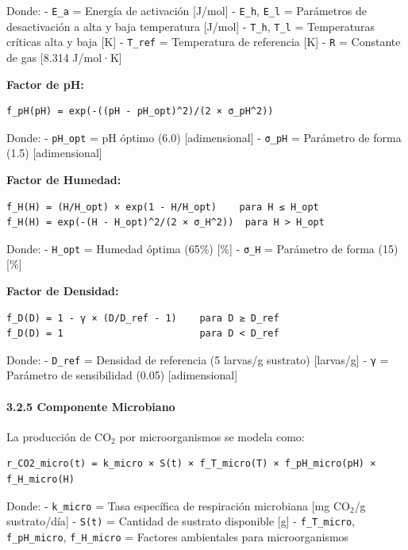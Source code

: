 \documentclass[
]{article}
\begin{document}
Donde: - \texttt{E\_a} = Energía de activación {[}J/mol{]} -
\texttt{E\_h}, \texttt{E\_l} = Parámetros de desactivación a alta y baja
temperatura {[}J/mol{]} - \texttt{T\_h}, \texttt{T\_l} = Temperaturas
críticas alta y baja {[}K{]} - \texttt{T\_ref} = Temperatura de
referencia {[}K{]} - \texttt{R} = Constante de gas {[}8.314 J/mol·K{]}

\textbf{Factor de pH:}

\begin{verbatim}
f_pH(pH) = exp(-((pH - pH_opt)^2)/(2 × σ_pH^2))
\end{verbatim}

Donde: - \texttt{pH\_opt} = pH óptimo (6.0) {[}adimensional{]} -
\texttt{σ\_pH} = Parámetro de forma (1.5) {[}adimensional{]}

\textbf{Factor de Humedad:}

\begin{verbatim}
f_H(H) = (H/H_opt) × exp(1 - H/H_opt)    para H ≤ H_opt
f_H(H) = exp(-(H - H_opt)^2/(2 × σ_H^2))  para H > H_opt
\end{verbatim}

Donde: - \texttt{H\_opt} = Humedad óptima (65\%) {[}\%{]} -
\texttt{σ\_H} = Parámetro de forma (15) {[}\%{]}

\textbf{Factor de Densidad:}

\begin{verbatim}
f_D(D) = 1 - γ × (D/D_ref - 1)    para D ≥ D_ref
f_D(D) = 1                        para D < D_ref
\end{verbatim}

Donde: - \texttt{D\_ref} = Densidad de referencia (5 larvas/g sustrato)
{[}larvas/g{]} - \texttt{γ} = Parámetro de sensibilidad (0.05)
{[}adimensional{]}

\paragraph{3.2.5 Componente Microbiano}\label{componente-microbiano}

La producción de CO$_2$ por microorganismos se modela como:

\begin{verbatim}
r_CO2_micro(t) = k_micro × S(t) × f_T_micro(T) × f_pH_micro(pH) × f_H_micro(H)
\end{verbatim}

Donde: - \texttt{k\_micro} = Tasa específica de respiración microbiana
{[}mg CO$_2$/g sustrato/día{]} - \texttt{S(t)} = Cantidad de sustrato
disponible {[}g{]} - \texttt{f\_T\_micro}, \texttt{f\_pH\_micro},
\texttt{f\_H\_micro} = Factores ambientales para microorganismos
\end{document}
